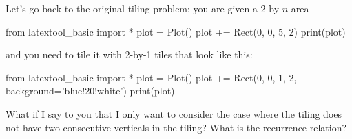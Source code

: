 Let's go back to the original tiling problem: 
you are given a 2-by-$n$ area
\begin{python}
from latextool_basic import *
plot = Plot()
plot += Rect(0, 0, 5, 2)
print(plot)
\end{python}
and you need to tile it with 2-by-1 tiles that look like this:
\begin{python}
from latextool_basic import *
plot = Plot()
plot += Rect(0, 0, 1, 2, background='blue!20!white')
print(plot)
\end{python}
What if I say to you that I only want to consider the
case where the tiling does not have two consecutive verticals in the tiling?
What is the recurrence relation?
